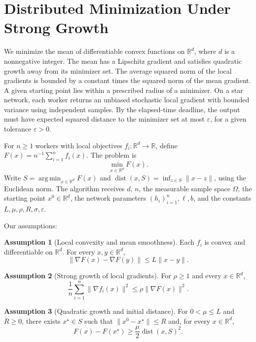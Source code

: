 \documentclass[10pt]{article}
\theoremstyle{definition}
\newtheorem{assumption}{Assumption}
\begin{document}
\section*{Distributed Minimization Under Strong Growth}
We minimize the mean of differentiable convex functions on $\mathbb{R}^d$, where $d$ is a nonnegative integer. The mean has a Lipschitz gradient and satisfies quadratic growth away from its minimizer set. The average squared norm of the local gradients is bounded by a constant times the squared norm of the mean gradient. A given starting point lies within a prescribed radius of a minimizer. On a star network, each worker returns an unbiased stochastic local gradient with bounded variance using independent samples. By the elapsed-time deadline, the output must have expected squared distance to the minimizer set at most $\varepsilon$, for a given tolerance $\varepsilon>0$.

For $n\geq 1$ workers with local objectives $f_i:\mathbb{R}^d\to\mathbb{R}$, define $F(x)=n^{-1}\sum_{i=1}^n f_i(x)$. The problem is
\[
\min_{x\in\mathbb{R}^d} F(x).
\]
Write $S=\operatorname*{arg\,min}_{x\in\mathbb{R}^d}F(x)$ and $\operatorname{dist}(x,S)=\inf_{z\in S}\|x-z\|$, using the Euclidean norm. The algorithm receives $d$, $n$, the measurable sample space $\Omega$, the starting point $x^0\in\mathbb{R}^d$, the network parameters $(h_i)_{i=1}^n,\ell,b$, and the constants $L,\mu,\rho,R,\sigma,\varepsilon$.

Our assumptions:
\begin{assumption}[Local convexity and mean smoothness]
Each $f_i$ is convex and differentiable on $\mathbb{R}^d$. For every $x,y\in\mathbb{R}^d$,
\[
\|\nabla F(x)-\nabla F(y)\|\leq L\|x-y\|.
\]
\end{assumption}

\begin{assumption}[Strong growth of local gradients]
For $\rho\geq 1$ and every $x\in\mathbb{R}^d$,
\[
\frac{1}{n}\sum_{i=1}^n\|\nabla f_i(x)\|^2
\leq \rho\|\nabla F(x)\|^2.
\]
\end{assumption}

\begin{assumption}[Quadratic growth and initial distance]
For $0<\mu\leq L$ and $R\geq 0$, there exists $x^\star\in S$ such that $\|x^0-x^\star\|\leq R$ and, for every $x\in\mathbb{R}^d$,
\[
F(x)-F(x^\star)\geq \frac{\mu}{2}\operatorname{dist}(x,S)^2.
\]
\end{assumption}
\end{document}
